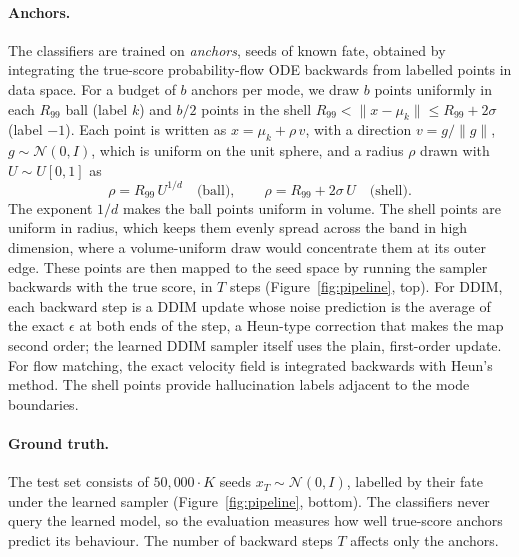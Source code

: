 \documentclass[11pt]{article}
\begin{document}
\paragraph{Anchors.}
The classifiers are trained on \emph{anchors}, seeds of known fate, obtained by integrating the
true-score probability-flow ODE backwards from labelled points in data space. For a budget of $b$
anchors per mode, we draw $b$ points uniformly in each $R_{99}$ ball (label $k$) and $b/2$ points
in the shell $R_{99} < \|x - \mu_k\| \le R_{99} + 2\sigma$ (label $-1$). Each point is written as
$x = \mu_k + \rho\, v$, with a direction $v = g / \|g\|$, $g \sim \mathcal{N}(0, I)$, which is
uniform on the unit sphere, and a radius $\rho$ drawn with $U \sim U[0, 1]$ as
\begin{equation}
    \rho = R_{99}\, U^{1/d} \quad \text{(ball)}, \qquad
    \rho = R_{99} + 2\sigma\, U \quad \text{(shell)}.
\end{equation}
The exponent $1/d$ makes the ball points uniform in volume. The shell points are uniform in
radius, which keeps them evenly spread across the band in high dimension, where a
volume-uniform draw would concentrate them at its outer edge. These points are then mapped to the
seed space by running the sampler backwards with the true score, in $T$ steps
(Figure~\ref{fig:pipeline}, top). For DDIM, each backward step is a DDIM update whose noise
prediction is the average of the exact $\epsilon$ at both ends of the step, a Heun-type
correction that makes the map second order; the learned DDIM sampler itself uses the plain,
first-order update. For flow matching, the exact velocity field is integrated backwards with
Heun's method. The shell points provide hallucination labels adjacent to the
mode boundaries.

\paragraph{Ground truth.}
The test set consists of $50{,}000 \cdot K$ seeds $x_T \sim \mathcal{N}(0, I)$, labelled by their
fate under the learned sampler (Figure~\ref{fig:pipeline}, bottom). The classifiers never query the
learned model, so the evaluation measures how well true-score anchors predict its behaviour. The
number of backward steps $T$ affects only the anchors.
\end{document}
